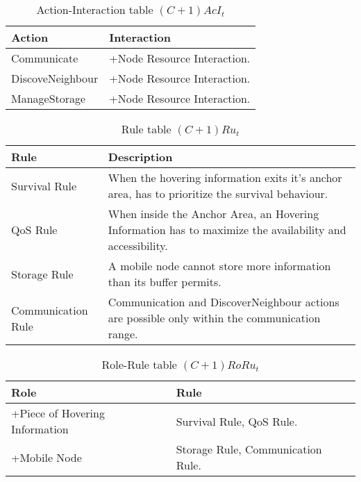 \begin{table}[H]
	\centering
	\begin{tabular}{|p{4cm}|p{8cm}|}
			\hline
			\textbf{Action} & \textbf{Interaction} \\
			\hline
			Communicate & +Node Resource Interaction.\\
			\hline
			DiscoveNeighbour & +Node Resource Interaction. \\
			\hline
			ManageStorage & +Node Resource Interaction. \\
			\hline
		\end{tabular}
	\caption{Action-Interaction table $(C+1)AcI_t$}
	\label{tab:cp1acit}
\end{table}

\begin{table}[H]
	\centering
	\begin{tabular}{|p{4cm}|p{8cm}|}
			\hline
			\textbf{Rule} & \textbf{Description} \\
			\hline
			Survival Rule & When the hovering information exits it's anchor area, has
			to prioritize the survival behaviour.\\
			\hline
			QoS Rule & When inside the Anchor Area, an Hovering Information has to
			maximize the availability and accessibility.\\
			\hline
			Storage Rule & A mobile node cannot store more information than its
			buffer permits. \\
			\hline
			Communication Rule & Communication and DiscoverNeighbour actions are
			possible only within the communication range. \\
			\hline
		\end{tabular}
	\caption{Rule table $(C+1)Ru_t$}
	\label{tab:cp1rut}
\end{table}

\begin{table}[H]
	\centering
	\begin{tabular}{|p{4cm}|p{8cm}|}
			\hline
			\textbf{Role} & \textbf{Rule} \\
			\hline
			+Piece of Hovering Information & Survival Rule, QoS Rule. \\
			\hline
			+Mobile Node & Storage Rule, Communication Rule. \\
			\hline
		\end{tabular}
	\caption{Role-Rule table $(C+1)RoRu_t$}
	\label{tab:cp1rorut}
\end{table}

